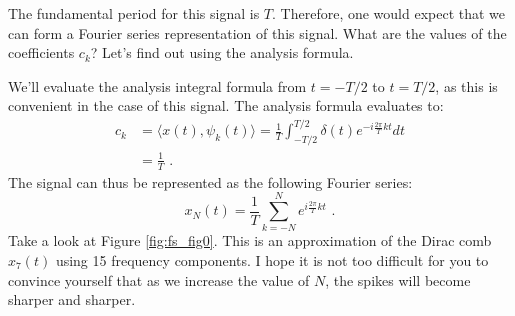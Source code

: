 The fundamental period for this signal is $T$. Therefore, one would expect that we can form a Fourier series representation of this signal. What are the values of the coefficients $c_k$? Let's find out using the analysis formula.

We'll evaluate the analysis integral formula from $t=-T/2$ to $t=T/2$, as this is convenient in the case of this signal. The analysis formula evaluates to:
\begin{align}
c_k &= \langle x(t),\psi_k(t) \rangle = \frac{1}{T} \int_{-T/2}^{T/2} \delta(t) e^{-i\frac{2\pi}{T}kt} dt \\
&= \frac{1}{T}\label{eq:dirac_comb_coeff} \,\,.
\end{align}
The signal can thus be represented as the following Fourier series:
\begin{equation}
x_N(t) = \frac{1}{T}\sum_{k=-N}^{N} e^{i\frac{2\pi}{T}kt} \,\,. 
\end{equation}
Take a look at Figure \ref{fig:fs_fig0}. This is an approximation of the Dirac comb $x_7(t)$ using 15 frequency components. 
I hope it is not too difficult for you to convince yourself that as we increase the value of $N$, the spikes will become sharper and sharper.

